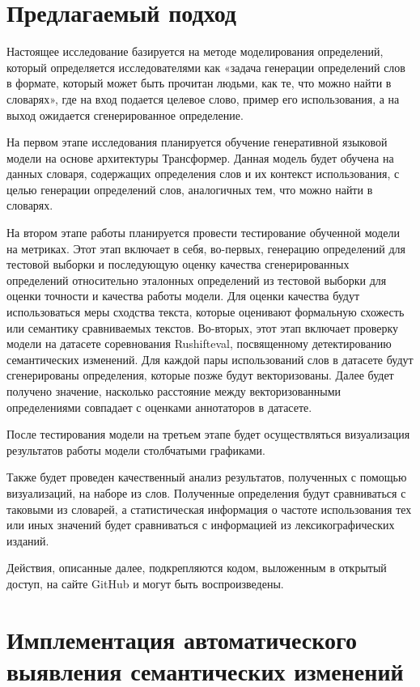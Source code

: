 \documentclass[LI,VKR]{HSEUniversity}
\begin{document}
\chapter{Предлагаемый подход}

Настоящее исследование базируется на методе моделирования определений,
который определяется исследователями как «задача генерации определений слов в формате,
который может быть прочитан людьми, как те, что можно найти в словарях»,
где на вход подается целевое слово, пример его использования, а на выход
ожидается сгенерированное определение.

На первом этапе исследования планируется обучение генеративной языковой модели
на основе архитектуры Трансформер.
Данная модель будет обучена на данных словаря,
содержащих определения слов и их контекст использования, с целью генерации определений слов,
аналогичных тем, что можно найти в словарях.

На втором этапе работы планируется провести тестирование обученной модели на метриках.
Этот этап включает в себя, во-первых, генерацию определений для тестовой выборки
и последующую оценку качества сгенерированных определений относительно
эталонных определений из тестовой выборки для оценки точности и качества работы модели.
Для оценки качества будут использоваться меры сходства текста,
которые оценивают формальную схожесть или семантику сравниваемых текстов.
Во-вторых, этот этап включает проверку модели на датасете соревнования Rushifteval,
посвященному детектированию семантических изменений.
Для каждой пары использований слов в датасете будут сгенерированы определения,
которые позже будут векторизованы.
Далее будет получено значение, насколько расстояние между векторизованными определениями
совпадает с оценками аннотаторов в датасете.

После тестирования модели на третьем этапе будет осуществляться визуализация
результатов работы модели столбчатыми графиками.

Также будет проведен качественный анализ результатов, полученных с помощью визуализаций,
на наборе из слов.
Полученные определения будут сравниваться с таковыми из словарей,
а статистическая информация о частоте использования тех или иных значений
будет сравниваться с информацией из лексикографических изданий.

Действия, описанные далее, подкрепляются кодом, выложенным в открытый доступ, на сайте GitHub
и могут быть воспроизведены.~\cite{WorkGitHub}

\chapter{Имплементация автоматического выявления семантических изменений}
\end{document}
